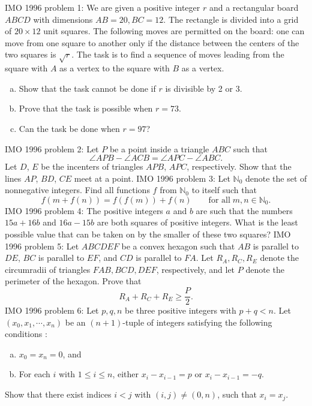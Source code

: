IMO 1996 problem 1:  We are given a positive integer $ r$ and a rectangular board $ ABCD$ with dimensions $ AB = 20, BC = 12$. The rectangle is divided into a grid of $ 20 \times 12$ unit squares. The following moves are permitted on the board: one can move from one square to another only if the distance between the centers of the two squares is $ \sqrt {r}$. The task is to find a sequence of moves leading from the square with $ A$ as a vertex to the square with $ B$ as a vertex.
\begin{enumerate}[(a)]
  \item Show that the task cannot be done if $ r$ is divisible by 2 or 3.
  \item Prove that the task is possible when $ r = 73$.
  \item Can the task be done when $ r = 97$?
\end{enumerate} 
IMO 1996 problem 2:  Let $ P$ be a point inside a triangle $ ABC$ such that
\[ \angle APB - \angle ACB = \angle APC - \angle ABC. \]
Let $ D$, $ E$ be the incenters of triangles $ APB$, $ APC$, respectively. Show that the lines $ AP$, $ BD$, $ CE$ meet at a point. 
IMO 1996 problem 3:  Let $ \mathbb{N}_0$ denote the set of nonnegative integers. Find all  functions $ f$ from $ \mathbb{N}_0$ to itself such that
\[ f(m + f(n)) = f(f(m)) + f(n)\qquad \text{for all} \; m, n \in \mathbb{N}_0. \] 
IMO 1996 problem 4:  The positive integers $ a$ and $ b$ are such that the numbers  $ 15a + 16b$ and $ 16a - 15b$ are both squares of positive integers. What is the least possible value that can be taken on by the smaller of these two squares? 
IMO 1996 problem 5:  Let $ ABCDEF$ be a convex hexagon such that $ AB$ is parallel to  $ DE$, $ BC$ is parallel to $ EF$, and $ CD$ is parallel to $ FA$. Let  $ R_A,R_C,R_E$ denote the circumradii of triangles $ FAB,BCD,DEF$, respectively, and let $ P$ denote the perimeter of the hexagon. Prove that
\[ R_A + R_C + R_E\geq \frac {P}{2}. \] 
IMO 1996 problem 6:  Let $ p,q,n$ be three positive integers with $ p + q < n$. Let $ (x_0,x_1,\cdots ,x_n)$ be an $ (n + 1)$-tuple of integers satisfying the following conditions :
\begin{enumerate}[(a)]
  \item $ x_0 = x_n = 0$, and
  \item For each $ i$ with $ 1\leq i\leq n$, either $ x_i - x_{i - 1} = p$ or $ x_i - x_{i - 1} = - q$.
\end{enumerate}
Show that there exist indices $ i < j$ with $ (i,j)\neq (0,n)$, such that $ x_i = x_j$. 

